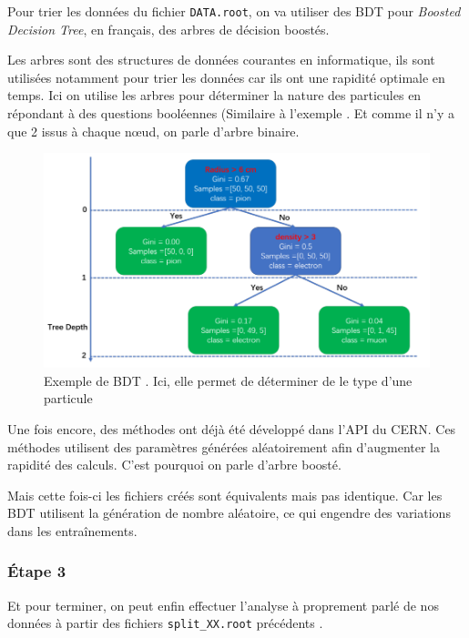 Pour trier les données du fichier \texttt{DATA.root}, on va utiliser des BDT pour \textit{Boosted Decision Tree}, en français, des arbres de décision boostés. 

Les arbres sont des structures de données courantes en informatique, ils sont utilisées notamment pour trier les données car ils ont une rapidité optimale en temps. 
Ici on utilise les arbres pour déterminer la nature des particules en répondant à des questions booléennes (Similaire à l'exemple \Figure{\ref{ExampleBDT}}. Et comme il n'y a que 2 issus à chaque nœud, on parle d'arbre binaire. 

\begin{figure}[h!]
	\center
	\includegraphics[width=\textwidth]{../img/ExampleBDT.png}
	\caption{Exemple de BDT \cite{liu:tel-03405418}. Ici, elle permet de déterminer de le type d'une particule}
	\label{ExampleBDT}
\end{figure}

Une fois encore, des méthodes ont déjà été développé dans l'API du CERN\cite{root:treeFriend}. Ces méthodes utilisent des paramètres générées aléatoirement afin d'augmenter la rapidité des calculs. C'est pourquoi on parle d'arbre boosté.

Mais cette fois-ci les fichiers créés sont équivalents mais pas identique. Car les BDT utilisent la génération de nombre aléatoire, ce qui engendre des variations dans les entraînements.

\subsubsection{Étape 3}

Et pour terminer, on peut enfin effectuer l'analyse à proprement parlé de nos données à partir des fichiers \texttt{split\_XX.root} précédents \Figure{\ref{files:split}}.


